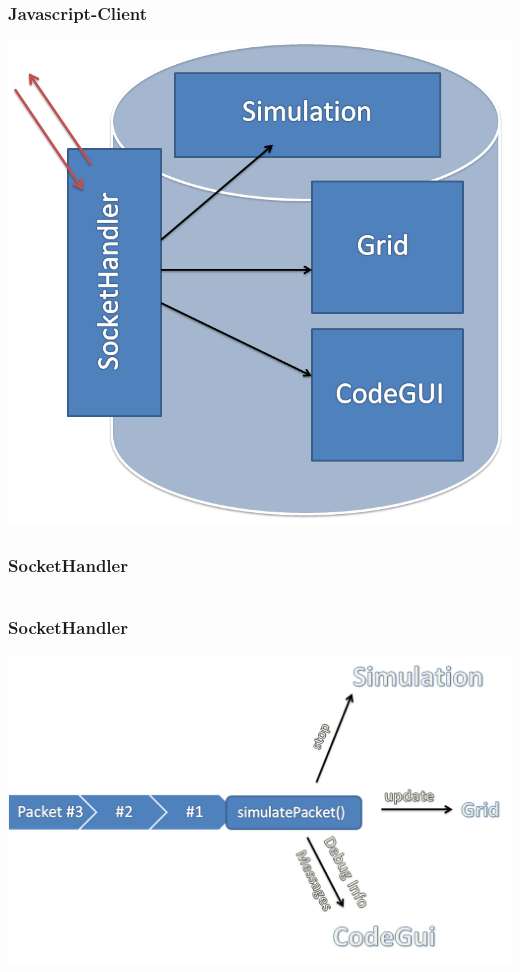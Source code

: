 \begin{frame}
\frametitle{Javascript-Client}
\begin{center}
	\includegraphics[scale=0.3]{client/modules.png}
\end{center}
\end{frame}


\begin{frame}
\frametitle{SocketHandler}
\inputminted[linenos, numbersep=2pt, tabsize=4, frame=lines, label=Beispiel Paket]{json}{client/packet.json}
\end{frame}

\begin{frame}
\frametitle{SocketHandler}
	\includegraphics[scale=0.37]{client/socket-queue}
\end{frame}

